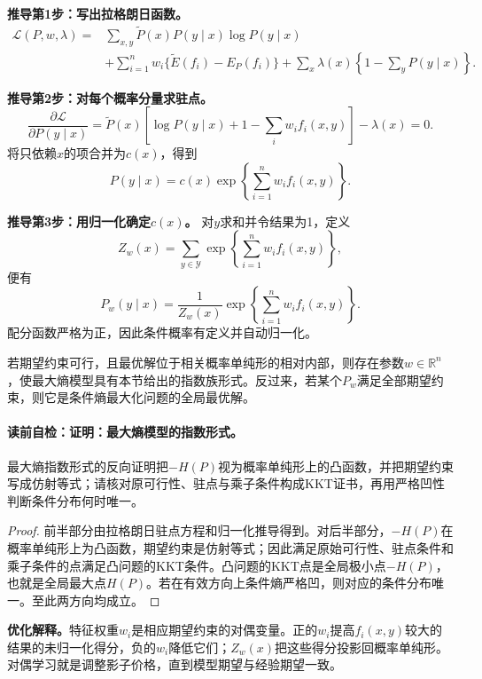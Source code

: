 \textbf{推导第1步：写出拉格朗日函数。}
\[
\begin{aligned}
\mathcal L(P,w,\lambda)
={}&\sum_{x,y}\widetilde P(x)P(y\mid x)\log P(y\mid x)\\
&+\sum_{i=1}^{n}w_i\{\widetilde E(f_i)-E_P(f_i)\}
+\sum_x\lambda(x)\left\{1-\sum_yP(y\mid x)\right\}.
\end{aligned}
\]

\textbf{推导第2步：对每个概率分量求驻点。}
\[
\frac{\partial\mathcal L}{\partial P(y\mid x)}
=\widetilde P(x)\left[\log P(y\mid x)+1-\sum_iw_if_i(x,y)\right]-\lambda(x)=0.
\]
将只依赖$x$的项合并为$c(x)$，得到
\[
P(y\mid x)=c(x)\exp\left\{\sum_{i=1}^{n}w_if_i(x,y)\right\}.
\]

\textbf{推导第3步：用归一化确定$c(x)$。}
对$y$求和并令结果为1，定义
\[
Z_w(x)=\sum_{y\in\mathcal Y}\exp\left\{\sum_{i=1}^{n}w_if_i(x,y)\right\},
\]
便有
\[
P_w(y\mid x)=\frac{1}{Z_w(x)}
\exp\left\{\sum_{i=1}^{n}w_if_i(x,y)\right\}.
\]
配分函数严格为正，因此条件概率有定义并自动归一化。

\label{struct:V3-C01-CH12}
\begin{theorem}[最大熵模型的指数形式]\label{thm:V3-C01-exponential-form}
若期望约束可行，且最优解位于相关概率单纯形的相对内部，则存在参数$w\in\mathbb R^n$，使最大熵模型具有本节给出的指数族形式。反过来，若某个$P_w$满足全部期望约束，则它是条件熵最大化问题的全局最优解。
\end{theorem}

\label{struct:V3-C01-CH13}
\paragraph{读前自检：证明：最大熵模型的指数形式。}最大熵指数形式的反向证明把$-H(P)$视为概率单纯形上的凸函数，并把期望约束写成仿射等式；请核对原可行性、驻点与乘子条件构成KKT证书，再用严格凹性判断条件分布何时唯一。\par

\begin{proof}
前半部分由拉格朗日驻点方程和归一化推导得到。对后半部分，$-H(P)$在概率单纯形上为凸函数，期望约束是仿射等式；因此满足原始可行性、驻点条件和乘子条件的点满足凸问题的KKT条件。凸问题的KKT点是全局极小点$-H(P)$，也就是全局最大点$H(P)$。若在有效方向上条件熵严格凹，则对应的条件分布唯一。至此两方向均成立。
\end{proof}

\label{struct:V3-C01-CH16}
\begin{optimizationbox}
\textbf{优化解释。}特征权重$w_i$是相应期望约束的对偶变量。正的$w_i$提高$f_i(x,y)$较大的结果的未归一化得分，负的$w_i$降低它们；$Z_w(x)$把这些得分投影回概率单纯形。对偶学习就是调整影子价格，直到模型期望与经验期望一致。
\end{optimizationbox}


